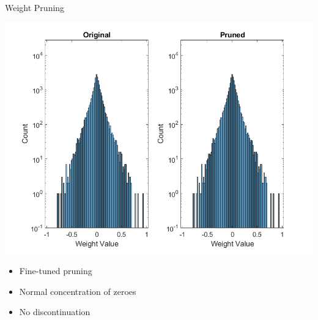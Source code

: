 \begin{frame}{Weight Pruning}
	\begin{minipage}{0.6\textwidth}
		\centering
		\includegraphics[width=\textwidth]{../Images/Weights-distributions/pruned/37.97/weight-distribution-conv1.png}\\
	\end{minipage}%
	\begin{minipage}{0.4\textwidth}
		\begin{itemize}
			\item Fine-tuned pruning
			\item Normal concentration of zeroes
			\item No discontinuation
		\end{itemize}
	\end{minipage}
\end{frame}
